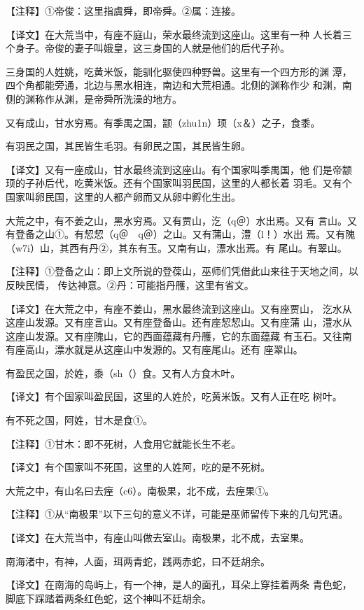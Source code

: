 \documentclass[a4paper,12pt,UTF8,twoside]{ctexbook}
\begin{document}
【注释】①帝俊：这里指虞舜，即帝舜。②属：连接。

【译文】在大荒当中，有座不庭山，荣水最终流到这座山。这里有一种 人长着三个身子。帝俊的妻子叫娥皇，这三身国的人就是他们的后代子孙。

三身国的人姓姚，吃黄米饭，能驯化驱使四种野兽。这里有一个四方形的渊 潭，四个角都能旁通，北边与黑水相连，南边和大荒相通。北侧的渊称作少 和渊，南侧的渊称作从渊，是帝舜所洗澡的地方。

又有成山，甘水穷焉。有季禺之国，颛（zhu1n）顼（x＆）之子，食黍。

有羽民之国，其民皆生毛羽。有卵民之国，其民皆生卵。

【译文】又有一座成山，甘水最终流到这座山。有个国家叫季禺国，他 们是帝颛顼的子孙后代，吃黄米饭。还有个国家叫羽民国，这里的人都长着 羽毛。又有个国家叫卵民国，这里的人都产卵而又从卵中孵化生出。

大荒之中，有不姜之山，黑水穷焉。又有贾山，汔（q＠）水出焉。又有 言山。又有登备之山①。有恝恝（q＠　q＠）之山。又有蒲山，澧（l！）水出 焉。又有隗（w7i）山，其西有丹②，其东有玉。又南有山，漂水出焉。有 尾山。有翠山。

【注释】①登备之山：即上文所说的登葆山，巫师们凭借此山来往于天地之间，以反映民情， 传达神意。②丹：可能指丹雘，这里有省文。

【译文】在大荒之中，有座不姜山，黑水最终流到这座山。又有座贾山， 汔水从这座山发源。又有座言山。又有座登备山。还有座恝恝山。又有座蒲 山，澧水从这座山发源。又有座隗山，它的西面蕴藏有丹雘，它的东面蕴藏 有玉石。又往南有座高山，漂水就是从这座山中发源的。又有座尾山。还有 座翠山。

有盈民之国，於姓，黍（sh（）食。又有人方食木叶。

【译文】有个国家叫盈民国，这里的人姓於，吃黄米饭。又有人正在吃 树叶。

有不死之国，阿姓，甘木是食①。

【注释】①甘木：即不死树，人食用它就能长生不老。

【译文】有个国家叫不死国，这里的人姓阿，吃的是不死树。

大荒之中，有山名曰去痓（c6）。南极果，北不成，去痓果①。

【注释】①从“南极果”以下三句的意义不详，可能是巫师留传下来的几句咒语。

【译文】在大荒当中，有座山叫做去室山。南极果，北不成，去室果。

南海渚中，有神，人面，珥两青蛇，践两赤蛇，曰不廷胡余。

【译文】在南海的岛屿上，有一个神，是人的面孔，耳朵上穿挂着两条 青色蛇，脚底下踩踏着两条红色蛇，这个神叫不廷胡余。
\end{document}
